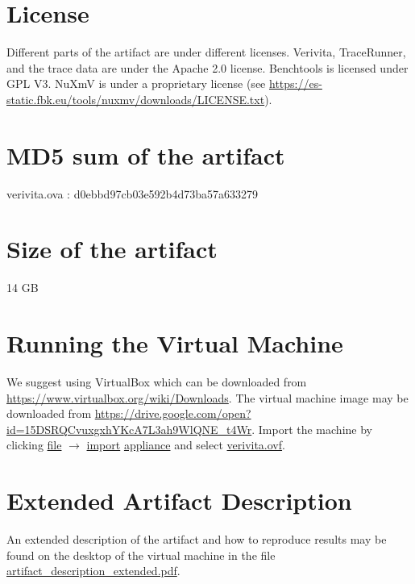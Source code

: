 \documentclass[a4paper,UKenglish]{darts-v2019}
\newcommand{\license}[1]{{\section{License}#1}}
\newcommand{\mdsum}[1]{{\section{MD5 sum of the artifact}#1}}
\newcommand{\artifactsize}[1]{{\section{Size of the artifact}#1}}
\begin{document}
\license{Different parts of the artifact are under different licenses. Verivita, TraceRunner, and the trace data are under the Apache 2.0 license.  Benchtools is licensed under GPL V3.  NuXmV is under a proprietary license (see \url{https://es-static.fbk.eu/tools/nuxmv/downloads/LICENSE.txt}).}

\mdsum{verivita.ova : d0ebbd97cb03e592b4d73ba57a633279}

\artifactsize{14 GB}

%

\appendix

\lstset{language=bash}
\section{Running the Virtual Machine}
We suggest using VirtualBox which can be downloaded from \url{https://www.virtualbox.org/wiki/Downloads}.
The virtual machine image may be downloaded from \url{https://drive.google.com/open?id=15DSRQCvuxgxhYKcA7L3ah9WlQNE_t4Wr}.
Import the machine by clicking \url{file} $\rightarrow$ \url{import} \url{appliance} and select \url{verivita.ovf}.


\section{Extended Artifact Description}
An extended description of the artifact and how to reproduce results may be found on the desktop of the virtual machine in the file \url{artifact_description_extended.pdf}.

\end{document}
